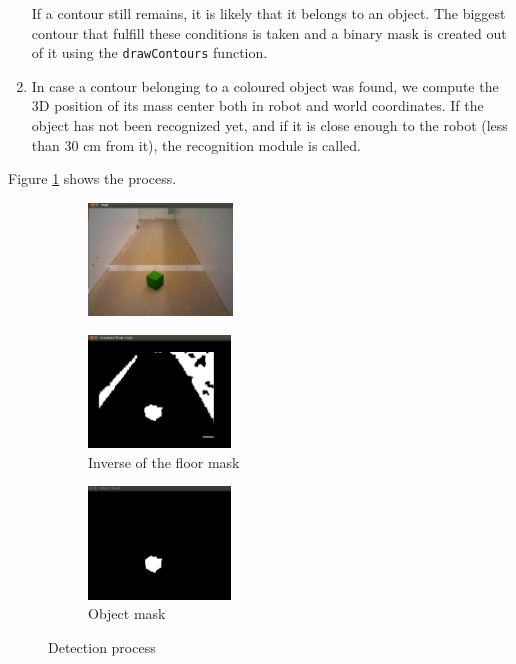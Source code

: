 \begin{enumerate}
If a contour still remains, it is likely that it belongs to an object. The biggest contour that fulfill these conditions is taken and a binary mask is created out of it using the \texttt{drawContours} function.

\item In case a contour belonging to a coloured object was found, we compute the 3D position of its mass center both in robot and world coordinates. If the object has not been recognized yet, and if it is close enough to the robot (less than 30 cm from it), the recognition module is called.

\end{enumerate}
Figure \ref{fig:detection} shows the process.

\begin{figure}[h]
        \centering
        \begin{subfigure}[b]{0.3\linewidth}
                \includegraphics[height=3cm]{figures/RGB.png}
        \end{subfigure}
        \begin{subfigure}[b]{0.3\linewidth}
                \includegraphics[height=3cm]{figures/no_floor_mask.jpg}
                \caption{Inverse of the floor mask}
        \end{subfigure}
        \begin{subfigure}[b]{0.3\linewidth}
                \includegraphics[height=3cm]{figures/object_mask.jpg}
                \caption{Object mask}
        \end{subfigure}
        \caption{Detection process}
        \label{fig:detection}
\end{figure}

